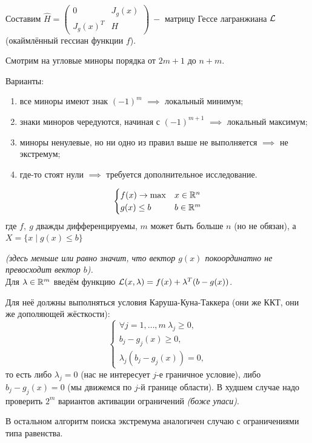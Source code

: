 \documentclass[a4paper,11pt]{article}
\begin{document}
Составим $\widehat{H} = \begin{pmatrix}
    0 & J_g(x)\\
    J_g(x)^T & H
\end{pmatrix}\ -$ матрицу Гессе лагранжиана $\mathcal{L}$ (окаймлённый гессиан функции $f$).

Смотрим на угловые миноры порядка от $2m+1$ до $n + m$.

Варианты:
\begin{enumerate}
    \item все миноры имеют знак $(-1)^m$ $\implies$ локальный минимум;
    \item знаки миноров чередуются, начиная с $(-1)^{m+1}$ $\implies$ локальный максимум;
    \item миноры ненулевые, но ни одно из правил выше не выполняется $\implies$ не экстремум;
    \item где-то стоят нули $\implies$ требуется дополнительное исследование.
\end{enumerate}
\[\begin{cases}
    f(x) \to \max & x\in\mathbb{R}^n\\
    g(x) \leq b & b\in\mathbb{R}^m
\end{cases}\]
где $f,\ g$ дважды дифференцируемы, $m$ может быть больше $n$ (но не обязан), а $X = \{x\mid g(x) \leq b\}$

\textit{(здесь меньше или равно значит, что вектор $g(x)$ покоординатно не превосходит вектор $b$).}\\[5mm]

Для $\lambda \in\mathbb{R}^m$ введём функцию $\mathcal{L}(x,\lambda) = f(x) + \lambda^T(b - g(x))$.

Для неё должны выполняться условия Каруша-Куна-Таккера (они же ККТ, они же дополяющей жёсткости):
\[\begin{cases}
    \forall j = 1,\dots, m\ \lambda_j \geq 0,\\
    b_j - g_j(x) \geq 0,\\
    \lambda_j(b_j - g_j(x)) = 0,
\end{cases}\]
то есть либо $\lambda_j = 0$ (нас не интересует $j$-е граничное условие), либо $b_j - g_j(x) = 0$ (мы движемся по $j$-й границе области). В худшем случае надо проверить $2^m$ вариантов активации ограничений \textit{(боже упаси)}.

В остальном алгоритм поиска экстремума аналогичен случаю с ограничениями типа равенства.

\begin{center}
\end{center}
\end{document}

